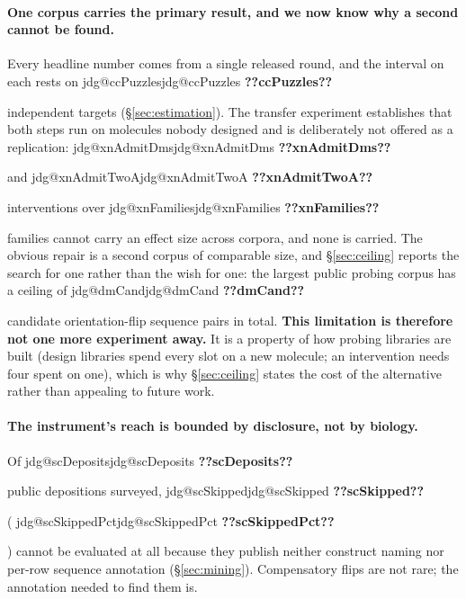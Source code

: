 \documentclass[11pt]{article}
\makeatletter
\newcommand{\jdg}[1]{%
  \ifcsname jdg@#1\endcsname\csname jdg@#1\endcsname
  \else\textbf{??#1??}\PackageError{nm}{undefined measured quantity #1}{}\fi}
\makeatother
\begin{document}
\paragraph{One corpus carries the primary result, and we now know why a second cannot be found.}
Every headline number comes from a single released round, and the interval on each rests on
\jdg{ccPuzzles} independent targets (\S\ref{sec:estimation}). The transfer experiment establishes
that both steps run on molecules nobody designed and is deliberately not offered as a replication:
\jdg{xnAdmitDms} and \jdg{xnAdmitTwoA} interventions over \jdg{xnFamilies} families cannot carry
an effect size across corpora, and none is carried. The obvious repair is a second corpus of
comparable size, and \S\ref{sec:ceiling} reports the search for one rather than the wish for one:
the largest public probing corpus has a ceiling of \jdg{dmCand} candidate orientation-flip
sequence pairs in total. \textbf{This limitation is therefore not one more experiment away.} It is
a property of how probing libraries are built (design libraries spend every slot on a new
molecule; an intervention needs four spent on one), which is why \S\ref{sec:ceiling} states the
cost of the alternative rather than appealing to future work.

\paragraph{The instrument's reach is bounded by disclosure, not by biology.} Of \jdg{scDeposits}
public depositions surveyed, \jdg{scSkipped} (\jdg{scSkippedPct}) cannot be evaluated at all
because they publish neither construct naming nor per-row sequence annotation
(\S\ref{sec:mining}). Compensatory flips are not rare; the annotation needed to find them is.
\end{document}
